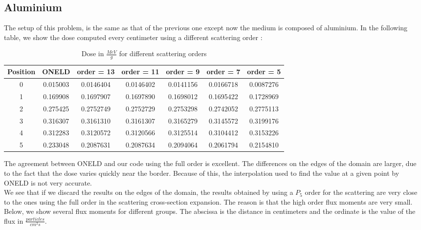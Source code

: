 \subsection{Aluminium}
The setup of this problem, is the same as that of the previous one except now 
the medium is composed of aluminium. In the following table, we show the dose 
computed every centimeter using a different scattering order :
\begin{table}[H]
\begin{center}
\caption{Dose in $\frac{MeV}{g}$ for different scattering orders}
\begin{tabular}{|c|c|c|c|c|c|c|}
\hline
Position & ONELD & order = 13 & order = 11 & order = 9 & order = 7 & order = 5 \\
\hline
0 & 0.015003 & 0.0146404 & 0.0146402 & 0.0141156 & 0.0166718 & 0.0087276 \\
1 & 0.169908 & 0.1697907 & 0.1697890 & 0.1698012 & 0.1695422 & 0.1728969 \\
2 & 0.275425 & 0.2752749 & 0.2752729 & 0.2753298 & 0.2742052 & 0.2775113 \\
3 & 0.316307 & 0.3161310 & 0.3161307 & 0.3165279 & 0.3145572 & 0.3199176 \\
4 & 0.312283 & 0.3120572 & 0.3120566 & 0.3125514 & 0.3104412 & 0.3153226 \\
5 & 0.233048 & 0.2087631 & 0.2087634 & 0.2094064 & 0.2061794 & 0.2154810 \\
\hline
\end{tabular}
\end{center}
\end{table}     
The agreement between ONELD and our code using the full order is excellent.
The differences on the edges of the domain are larger, due to the fact that
the dose varies quickly near the border. Because of this, the interpolation 
used to find the value at a given point by ONELD is not very accurate.\\ 
We see that if we discard the results on the edges of the domain, the results 
obtained by using a $P_5$ order for the scattering are very close to the ones 
using the
full order in the scattering cross-section expansion. The reason is that the 
high order flux moments are very small. Below,
we show several flux moments for different groups. The abscissa is the distance in
centimeters and the ordinate is the value of the flux in $\frac{particles}{cm^2
s}$.
